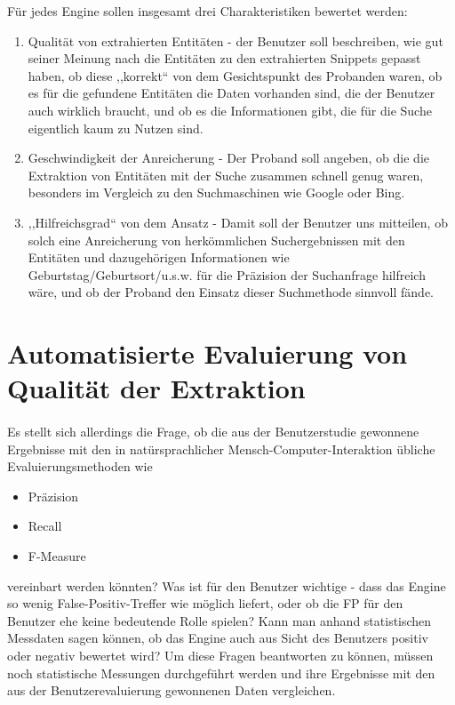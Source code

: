 Für jedes Engine sollen insgesamt drei Charakteristiken bewertet werden:
\begin{enumerate}
\item Qualität von extrahierten Entitäten - der Benutzer soll beschreiben, wie gut seiner Meinung nach die Entitäten zu den extrahierten Snippets gepasst haben, ob diese ,,korrekt`` von dem Gesichtspunkt des Probanden waren, ob es für die gefundene Entitäten die Daten vorhanden sind, die der Benutzer auch wirklich braucht, und ob es die Informationen gibt, die für die Suche eigentlich kaum zu Nutzen sind.
\item Geschwindigkeit der Anreicherung - Der Proband soll angeben, ob die die Extraktion von Entitäten mit der Suche zusammen schnell genug waren, besonders im Vergleich zu den Suchmaschinen wie Google oder Bing.
\item ,,Hilfreichsgrad`` von dem Ansatz - Damit soll der Benutzer uns mitteilen, ob solch eine Anreicherung von herkömmlichen Suchergebnissen mit den Entitäten und dazugehörigen Informationen wie Geburtstag/Geburtsort/u.s.w. für die Präzision der Suchanfrage hilfreich wäre, und ob der Proband den Einsatz dieser Suchmethode sinnvoll fände.  
\end{enumerate}

\section{Automatisierte Evaluierung von Qualität der Extraktion}
\paragraph{}
Es stellt sich allerdings die Frage, ob die aus der Benutzerstudie gewonnene Ergebnisse mit den in natürsprachlicher Mensch-Computer-Interaktion übliche Evaluierungsmethoden wie 
\begin{itemize}
\item Präzision
\item Recall
\item F-Measure
\end{itemize}
vereinbart werden könnten? Was ist für den Benutzer wichtige - dass das Engine so wenig False-Positiv-Treffer wie möglich liefert, oder ob die FP für den Benutzer ehe keine bedeutende Rolle spielen? Kann man anhand statistischen Messdaten sagen können, ob das Engine auch aus Sicht des Benutzers positiv oder negativ bewertet wird? Um diese Fragen beantworten zu können, müssen noch statistische Messungen durchgeführt werden und ihre Ergebnisse mit den aus der Benutzerevaluierung gewonnenen Daten vergleichen.

